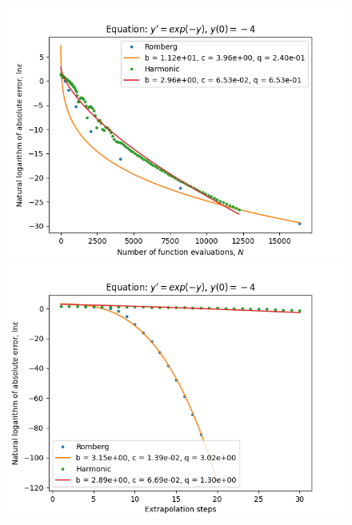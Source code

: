 \begin{figure}[H]
\centering
\begin{minipage}{0.45\textwidth}
\centering
\includegraphics[scale=0.45]{../results/emr_plots/ln_em4_hp_trend.png}
\end{minipage}
\begin{minipage}{0.45\textwidth}
\centering
\includegraphics[scale=0.45]{../results/emr_plots/ln_em4_hp_steps.png}
\end{minipage}
\end{figure}

